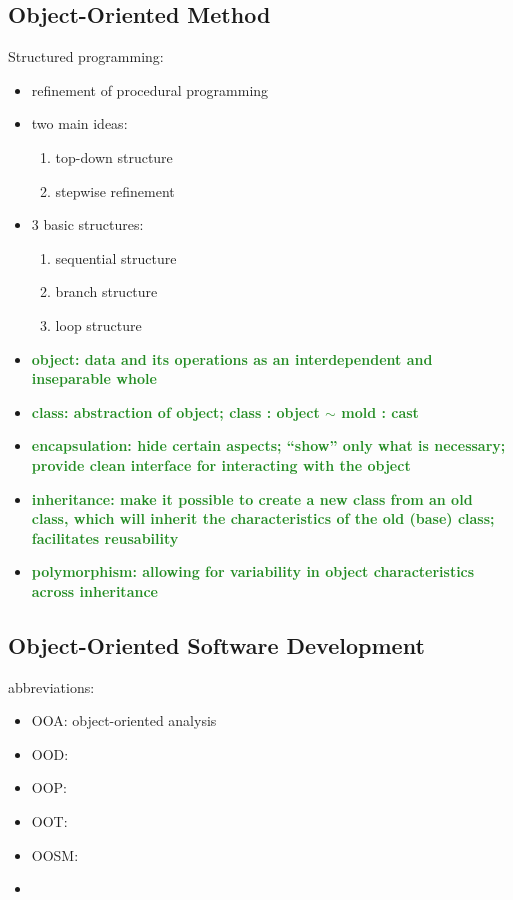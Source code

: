 \documentclass[a4paper]{article}
\newcommand{\obs}[1]{\textcolor{ForestGreen}{\textbf{#1}}}
\begin{document}
\subsection{Object-Oriented Method}
Structured programming:
\begin{itemize}
    \item refinement of procedural programming
    \item two main ideas: 
    \begin{enumerate}  
        \item top-down structure
        \item stepwise refinement
    \end{enumerate}
    \item 3 basic structures:
    \begin{enumerate}
        \item sequential structure
        \item branch structure
        \item loop structure
    \end{enumerate}
    \item \obs{object: data and its operations as an interdependent and inseparable whole}
    \item \obs{class: abstraction of object; class : object $\sim$ mold : cast}
    \item \obs{encapsulation: hide certain aspects; ``show'' only what is necessary;  provide clean interface for interacting with the object}
    \item \obs{inheritance: make it possible to create a new class from an old class, which will inherit the characteristics of the old (base) class; facilitates reusability}
    \item \obs{polymorphism: allowing for variability in object characteristics across inheritance}
\end{itemize}


\subsection{Object-Oriented Software Development}
abbreviations:
\begin{itemize}
    \item OOA: object-oriented analysis
    \item OOD: 
    \item OOP: 
    \item OOT: 
    \item OOSM: 
    \item 
\end{itemize}
\end{document}
